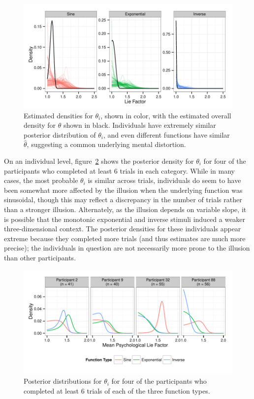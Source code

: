 \documentclass[11pt]{isuthesis}\usepackage[]{graphicx}\usepackage[]{color}
\begin{document}
\begin{figure}\centering
\includegraphics[width=.8\linewidth, trim=0in .1in 0in .1in]{fig-spaghettiIndivDists}
\caption[Estimated distortion factor]{Estimated densities for $\theta_i$, shown in color, with the estimated overall density for $\theta$ shown in black. Individuals have extremely similar posterior distribution of $\theta_i$, and even different functions have similar $\hat\theta$, suggesting a common underlying mental distortion.}\label{fig:overalldensity}
\end{figure}

On an individual level, figure~\ref{fig:indivdensity} shows the posterior density for $\theta_i$ for four of the participants who completed at least 6 trials in each category. While in many cases, the most probable $\theta_i$ is similar across trials, individuals do seem to have been somewhat more affected by the illusion when the underlying function was sinusoidal, though this may reflect a discrepancy in the number of trials rather than a stronger illusion. Alternately, as the illusion depends on variable slope, it is possible that the monotonic exponential and inverse stimuli induced a weaker three-dimensional context. The posterior densities for these individuals appear extreme because they completed more trials (and thus estimates are much more precise); the individuals in question are not necessarily more prone to the illusion than other participants. 

\begin{figure}\centering
\includegraphics[width=.8\linewidth, trim=0in .2in 0in .1in]{fig-IndivMeanAllFcns}
\caption[Individual posterior distributions for psychological distortion]{Posterior distributions for $\theta_i$ for four of the participants who completed at least 6 trials of each of the three function types.}\label{fig:indivdensity}
\end{figure}
\end{document}
